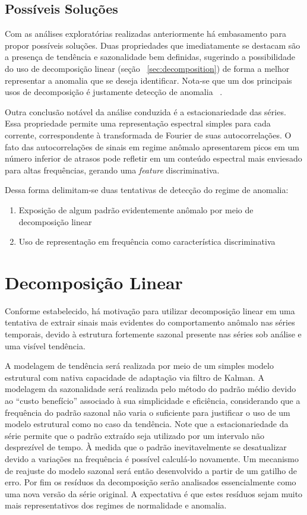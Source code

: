 \subsection{Possíveis Soluções}

Com as análises exploratórias realizadas anteriormente há embasamento para
propor possíveis soluções. Duas propriedades que imediatamente se destacam são
a presença de tendência e sazonalidade bem definidas, sugerindo a possibilidade
do uso de decomposição linear (seção ~\ref{sec:decomposition}) de forma a melhor
representar a anomalia que se deseja identificar. Nota-se que um dos principais
usos de decomposição é justamente detecção de anomalia
~\cite{anomaly_detection_decomposition}.

Outra conclusão notável da análise conduzida é a estacionariedade das séries.
Essa propriedade permite uma representação espectral simples para cada
corrente, correspondente à transformada de Fourier de suas autocorrelações. O
fato das autocorrelações de sinais em regime anômalo apresentarem picos em um
número inferior de atrasos pode refletir em um conteúdo espectral mais
enviesado para altas frequências, gerando uma \emph{feature} discriminativa.

Dessa forma delimitam-se duas tentativas de detecção do regime de anomalia:

\begin{enumerate}
    \item Exposição de algum padrão evidentemente anômalo por meio de decomposição linear
    \item Uso de representação em frequência como característica discriminativa
\end{enumerate}

\section{Decomposição Linear}

Conforme estabelecido, há motivação para utilizar decomposição linear em uma
tentativa de extrair sinais mais evidentes do comportamento anômalo nas séries
temporais, devido à estrutura fortemente sazonal presente nas séries sob
análise e uma visível tendência.

A modelagem de tendência será realizada por meio de um simples modelo
estrutural com nativa capacidade de adaptação via filtro de Kalman. A modelagem
da sazonalidade será realizada pelo método do padrão médio devido ao ``custo
benefício'' associado à sua simplicidade e eficiência, considerando que a
frequência do padrão sazonal não varia o suficiente para justificar o uso de
um modelo estrutural como no caso da tendência. Note
que a estacionariedade da série permite que o padrão extraído seja utilizado
por um intervalo não desprezível de tempo. À medida que o padrão
inevitavelmente se desatualizar devido a variações na frequência é possível
calculá-lo novamente. Um mecanismo de reajuste do modelo sazonal será então
desenvolvido a partir de um gatilho de erro. Por fim os resíduos da
decomposição serão analisados essencialmente como uma nova versão da série
original. A expectativa é que estes resíduos sejam muito mais representativos
dos regimes de normalidade e anomalia.

